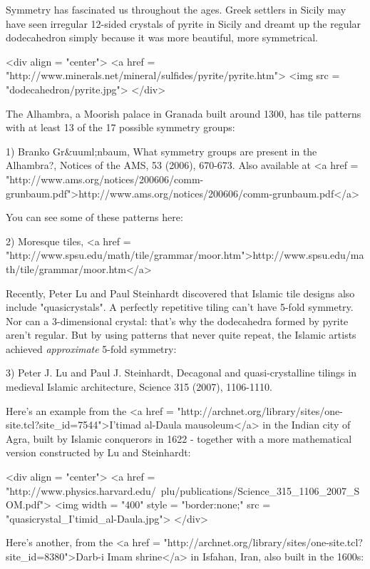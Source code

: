 

Symmetry has fascinated us throughout the ages.  Greek settlers 
in Sicily may have seen irregular 12-sided crystals of pyrite in Sicily
and dreamt up the regular dodecahedron simply because it was more 
beautiful, more symmetrical. 

<div align = "center">
<a href = "http://www.minerals.net/mineral/sulfides/pyrite/pyrite.htm">
<img src = "dodecahedron/pyrite.jpg">
</div>

The Alhambra, a Moorish palace in Granada
built around 1300, has tile patterns with at least 13 of the 17 possible 
symmetry groups:

1) Branko Gr&uuml;nbaum, What symmetry groups are present in the 
Alhambra?, Notices of the AMS, 53 (2006),
670-673.  Also available at <a href = "http://www.ams.org/notices/200606/comm-grunbaum.pdf">http://www.ams.org/notices/200606/comm-grunbaum.pdf</a>

You can see some of these patterns here:

2) Moresque tiles, <a href = "http://www.spsu.edu/math/tile/grammar/moor.htm">http://www.spsu.edu/math/tile/grammar/moor.htm</a>

Recently, Peter Lu and Paul Steinhardt discovered that Islamic tile 
designs also include "quasicrystals".  A perfectly repetitive tiling
can't have 5-fold symmetry.  Nor can a 3-dimensional crystal: that's why
the dodecahedra formed by pyrite aren't regular.  But by using 
patterns that never quite repeat, the Islamic artists
achieved \emph{approximate} 5-fold symmetry:

3) Peter J. Lu and Paul J. Steinhardt, Decagonal and quasi-crystalline
tilings in medieval Islamic architecture, Science 315 (2007),
1106-1110.  

Here's an example from the <a href = "http://archnet.org/library/sites/one-site.tcl?site_id=7544">I'timad al-Daula mausoleum</a> in the Indian city of
Agra, built by Islamic conquerors in 1622 - together with a more 
mathematical version constructed by Lu and Steinhardt:

<div align = "center">
<a href = "http://www.physics.harvard.edu/~plu/publications/Science_315_1106_2007_SOM.pdf">
<img width = "400" style = "border:none;" src = "quasicrystal_I'timid_al-Daula.jpg">
</div>

Here's another, from the 
<a href = "http://archnet.org/library/sites/one-site.tcl?site_id=8380">Darb-i Imam shrine</a>
in Isfahan, Iran, also built 
in the 1600s:


